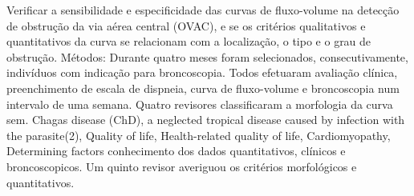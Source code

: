 \documentclass[10pt,a4paper]{article}
\begin{document}
\printtitle 
\printauthor



                  \renewcommand{\xrefbibrstyle}{}
                  \renewcommand{\xrefbibr}[1]{\xrefbibrstyle#1}
            
                  Verificar a sensibilidade e especificidade das curvas de fluxo-volume na
                  detecção de obstrução da via aérea central (OVAC), e se os critérios
                  qualitativos e quantitativos da curva se relacionam com a localização, o
                  tipo e o grau de obstrução. Métodos: Durante quatro meses foram
                  selecionados, consecutivamente, indivíduos com indicação para
                  broncoscopia. Todos efetuaram avaliação clínica, preenchimento de escala
                  de dispneia, curva de fluxo-volume e broncoscopia num intervalo de uma
                  semana. Quatro revisores classificaram a morfologia da curva sem.      
                  Chagas disease (ChD), a neglected tropical disease caused by infection 
                   with the parasite\xrefbibr{(2)}, Quality of life, 
                  Health-related quality of life, Cardiomyopathy, Determining factors
                  conhecimento dos dados quantitativos, clínicos e broncoscopicos. Um
                  quinto revisor averiguou os critérios morfológicos e quantitativos.

%
\end{document}
